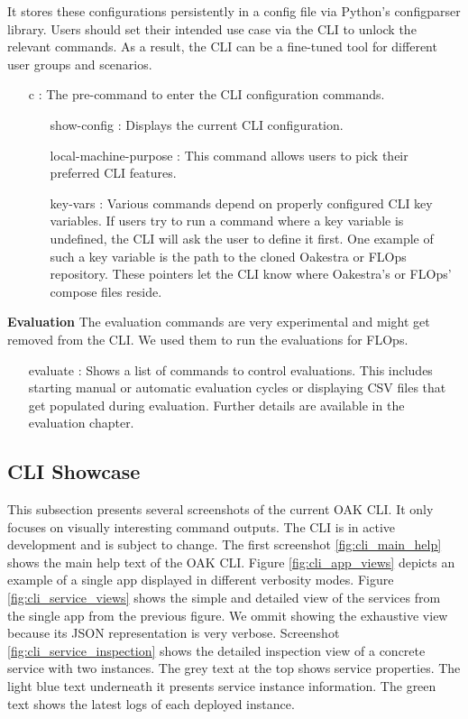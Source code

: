 It stores these configurations persistently in a config file via Python's configparser library.
Users should set their intended use case via the CLI to unlock the relevant commands.
As a result, the CLI can be a fine-tuned tool for different user groups and scenarios.
\begin{itemize}
    \item [c]:
        The pre-command to enter the CLI configuration commands.
        \begin{itemize}
            \item [show-config]:
                Displays the current CLI configuration.
            \item [local-machine-purpose]:
                This command allows users to pick their preferred CLI features.
            \item [key-vars]:
                Various commands depend on properly configured CLI key variables.
                If users try to run a command where a key variable is undefined, the CLI will ask the user to define it first.
                One example of such a key variable is the path to the cloned Oakestra or FLOps repository.
                These pointers let the CLI know where Oakestra's or FLOps' compose files reside.
        \end{itemize}
\end{itemize}
\vspace{5mm}
\textbf{Evaluation}\newline
The evaluation commands are very experimental and might get removed from the CLI.
We used them to run the evaluations for FLOps.

\begin{itemize}
    \item [evaluate]:
        Shows a list of commands to control evaluations.
        This includes starting manual or automatic evaluation cycles or displaying CSV files that get populated during evaluation.
        Further details are available in the evaluation chapter.
\end{itemize}

\subsection{CLI Showcase}

This subsection presents several screenshots of the current OAK CLI.
It only focuses on visually interesting command outputs. 
The CLI is in active development and is subject to change.
The first screenshot \ref{fig:cli_main_help} shows the main help text of the OAK CLI.
Figure \ref{fig:cli_app_views} depicts an example of a single app displayed in different verbosity modes.
Figure \ref{fig:cli_service_views} shows the simple and detailed view of the services from the single app from the previous figure.
We ommit showing the exhaustive view because its JSON representation is very verbose.
Screenshot \ref{fig:cli_service_inspection} shows the detailed inspection view of a concrete service with two instances.
The grey text at the top shows service properties.
The light blue text underneath it presents service instance information.
The green text shows the latest logs of each deployed instance.

